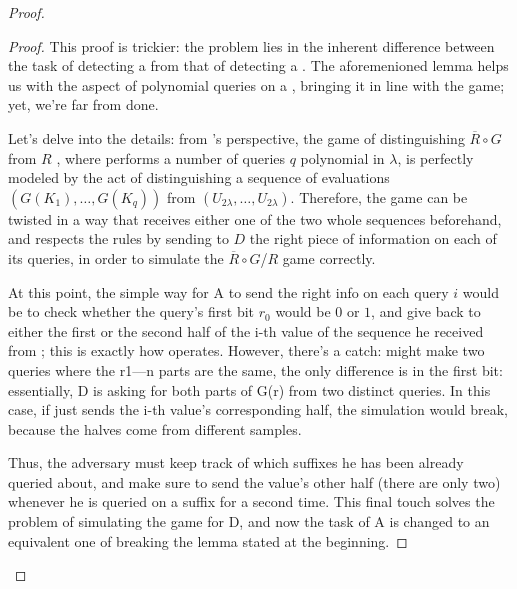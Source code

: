 \begin{proof}
    \begin{proof}

        This proof is trickier: the problem lies in the inherent difference between the task of detecting a \prg{} from that of detecting a \prf{}. The aforemenioned lemma helps us with the aspect of polynomial queries on a \prg{}, bringing it in line with the \prf{} game; yet, we're far from done.

        Let's delve into the details: from \adversary's perspective, the game of distinguishing $\overline{R} \circ G$ from $R$ , where \distinguisher{} performs a number of queries $q$ polynomial in $\lambda$, is perfectly modeled by the act of distinguishing a sequence of evaluations $(G(K_1), \dots, G(K_q))$ from $(U_{2\lambda}, \dots, U_{2\lambda})$. Therefore, the game can be twisted in a way that \adversary{} receives either one of the two whole sequences beforehand, and respects the rules by sending to $D$ the right piece of information on each of its queries, in order to simulate the $\overline{R} \circ G$/$R$ game correctly.

        At this point, the simple way for A to send the right info on each query $i$ would be to check whether the query's first bit $r_0$ would be $0$ or $1$, and give back to \distinguisher{} either the first or the second half of the i-th value of the sequence he received from \challenger{}; this is exactly how \ggm{} operates. However, there's a catch: \distinguisher{} might make two queries where the r1---n parts are the same, the only difference is in the first bit: essentially, D is asking for both parts of G(r) from two distinct queries. In this case, if \adversary{} just sends the i-th value's corresponding half, the simulation would break, because the halves come from different samples.
        
        Thus, the adversary must keep track of which suffixes he has been already queried about, and make sure to send the value's other half (there are only two) whenever he is queried on a suffix for a second time. This final touch solves the problem of simulating the game for D, and now the task of A is changed to an equivalent one of breaking the lemma stated at the beginning.
        
\end{proof}
\end{proof}
